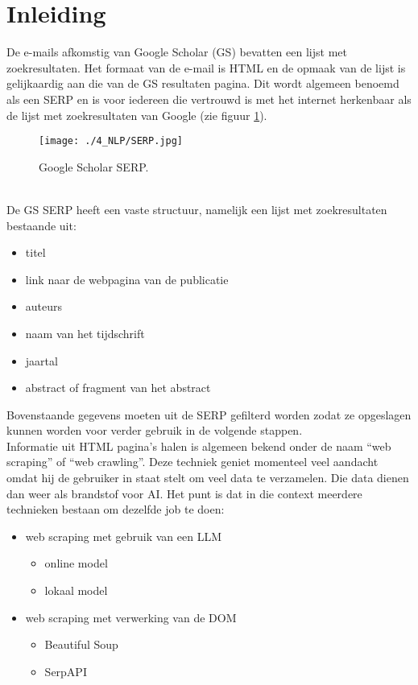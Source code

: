 \section{Inleiding}
De e-mails afkomstig van Google Scholar (GS) bevatten een lijst met zoekresultaten. Het formaat van de e-mail is HTML en de opmaak van de lijst is gelijkaardig aan die van de GS resultaten pagina. Dit wordt algemeen benoemd als een SERP en is voor iedereen die vertrouwd is met het internet herkenbaar als de lijst met zoekresultaten van Google (zie figuur \ref{fig:Google_Scholar_SERP}).
\begin{figure}
    \centering
    \texttt{[image: ./4\_NLP/SERP.jpg]}
    \caption[Google Scholar SERP.]{\label{fig:Google_Scholar_SERP}Google Scholar SERP.}
\end{figure}\\
De GS SERP heeft een vaste structuur, namelijk een lijst met zoekresultaten bestaande uit:
\begin{itemize}
    \item titel
    \item link naar de webpagina van de publicatie
    \item auteurs
    \item naam van het tijdschrift
    \item jaartal
    \item abstract of fragment van het abstract
\end{itemize} 
Bovenstaande gegevens moeten uit de SERP gefilterd worden zodat ze opgeslagen kunnen worden voor verder gebruik in de volgende stappen.\\
Informatie uit HTML pagina's halen is algemeen bekend onder de naam ``web scraping'' of  ``web crawling''. Deze techniek geniet momenteel veel aandacht omdat hij de gebruiker in staat stelt om veel data te verzamelen. Die data dienen dan weer als brandstof voor AI. Het punt is dat in die context meerdere technieken bestaan om dezelfde job te doen:
\begin{itemize}
    \item web scraping met gebruik van een LLM
    \begin{itemize}
        \item online model
        \item lokaal model
    \end{itemize}
    \item web scraping met verwerking van de DOM
    \begin{itemize}
        \item Beautiful Soup
        \item SerpAPI
    \end{itemize}
\end{itemize} 

